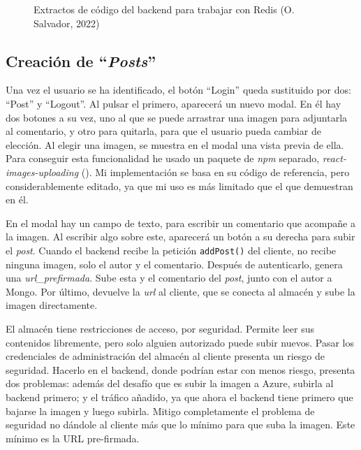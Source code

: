 \documentclass[11pt]{article}
\begin{document}
\begin{flushleft}
\begin{figure}[htb]
			\caption{Extractos de código del backend para trabajar con Redis (O. Salvador, 2022)}
			\label{extractos_redis}
		\end{figure}
  
  \bigskip
  \bigskip
  
	\subsection{Creación de ``\textit{Posts}''}
	Una vez el usuario se ha identificado, el botón ``Login'' queda sustituido por dos: ``Post'' y ``Logout''. Al pulsar el primero, aparecerá un nuevo modal. En él hay dos botones a su vez, uno al que se puede arrastrar una imagen para adjuntarla al comentario, y otro para quitarla, para que el usuario pueda cambiar de elección. Al elegir una imagen, se muestra en el modal una vista previa de ella.  Para conseguir esta funcionalidad he usado un paquete de \textit{\acrshort{npm}} separado, \textit{react-images-uploading} (\cite{react_imgs}). Mi implementación se basa en su código de referencia, pero considerablemente editado, ya que mi uso es más limitado que el que demuestran en él.
	\linebreak
	
	En el modal hay un campo de texto, para escribir un comentario que acompañe a la imagen. Al escribir algo sobre este, aparecerá un botón a su derecha para subir el \textit{post}. Cuando el backend recibe la petición \texttt{addPost()} del cliente, no recibe ninguna imagen, solo el autor y el comentario. Después de autenticarlo, genera una \textit{\gls{url_prefirmada}}. Sube esta y el comentario del \textit{post}, junto con el autor a Mongo. Por último, devuelve la \textit{\acrshort{url}} al cliente, que se conecta al almacén y sube la imagen directamente.
	\linebreak
	
	El almacén tiene restricciones de acceso, por seguridad. Permite leer sus contenidos libremente, pero solo alguien autorizado puede subir nuevos. Pasar los credenciales de administración del almacén al cliente presenta un riesgo de seguridad. Hacerlo en el backend, donde podrían estar con menos riesgo, presenta dos problemas: además del desafío que es subir la imagen a Azure, subirla al backend primero; y el tráfico añadido, ya que ahora el backend tiene primero que bajarse la imagen y luego subirla. Mitigo completamente el problema de seguridad no dándole al cliente más que lo mínimo para que suba la imagen. Este mínimo es la URL pre-firmada.
	\linebreak
	

\end{flushleft}
\end{document}
